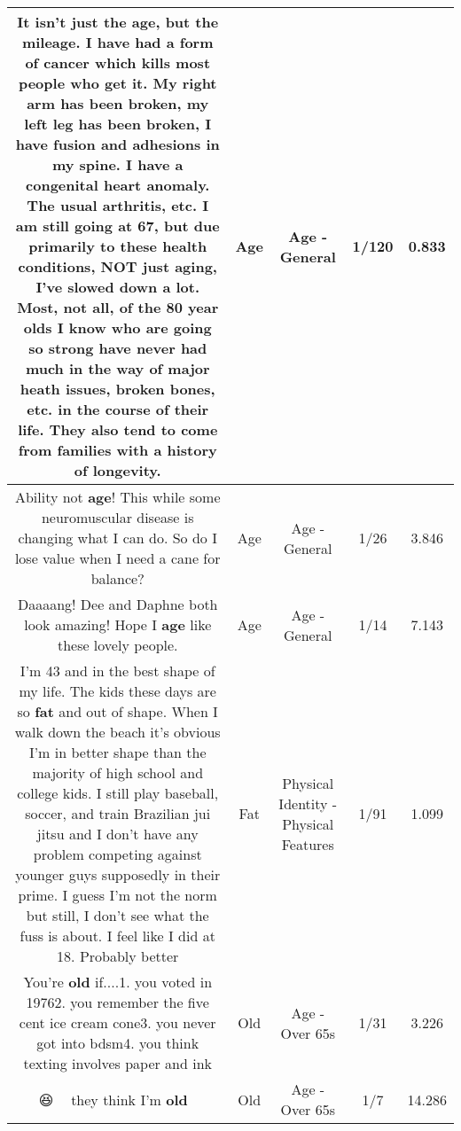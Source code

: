 \documentclass[11pt]{article}
\newlength\mylength
\begin{document}
\begin{center}
\begin{longtable}{|C{.65\mylength}|C{.30\mylength}|C{.12\mylength}|C{.12\mylength}|C{.12\mylength}|}
  \small It isn't just the \textbf{age}, but the mileage. I have had a form of cancer which kills most people who get it. My right arm has been broken, my left leg has been broken, I have fusion and adhesions in my spine. I have a congenital heart anomaly. The usual arthritis, etc. I am still going at 67, but due primarily to these health conditions, NOT just aging, I've slowed down a lot. Most, not all, of the 80 year olds I know who are going so strong have never had much in the way of major heath issues, broken bones, etc. in the course of their life. They also tend to come from families with a history of longevity.\normalsize   & Age & Age - General & 1/120 & 0.833 \\  \hline
  \small Ability  not \textbf{age}! This while some neuromuscular  disease is changing what I  can do. So do I lose value when I  need a cane for balance?\normalsize   & Age & Age - General & 1/26 & 3.846 \\  \hline
  \small Daaaang! Dee and Daphne both look amazing! Hope I \textbf{age} like these lovely people.\normalsize   & Age & Age - General & 1/14 & 7.143 \\  \hline
  \small I'm 43 and in the best shape of my life. The kids these days are so \textbf{fat} and out of shape. When I walk down the beach it's obvious I'm in better shape than the majority of high school and college kids. I still play baseball, soccer, and train Brazilian jui jitsu and I don't have any problem competing against younger guys supposedly in their prime. I guess I'm not the norm but still, I don't see what the fuss is about. I feel like I did at 18. Probably better\normalsize   & Fat & Physical Identity - Physical Features & 1/91 & 1.099 \\  \hline
  \small You're \textbf{old} if....1. you voted in 19762. you remember the five cent ice cream cone3. you never got into bdsm4. you think texting involves paper and ink\normalsize   & Old & Age - Over 65s & 1/31 & 3.226 \\  \hline
  \small 😆 🤔😢 they think I'm \textbf{old} 🙁\normalsize   & Old & Age - Over 65s & 1/7 & 14.286 \\  \hline

\end{longtable}
\end{center}
\end{document}
